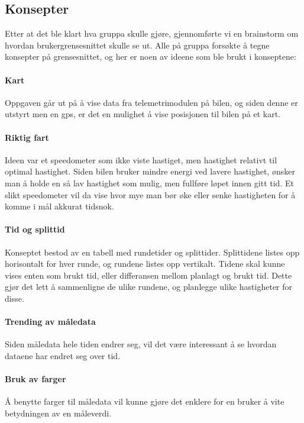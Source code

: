 \subsection{Konsepter}
Etter at det ble klart hva gruppa skulle gjøre, gjennomførte vi en brainstorm om hvordan brukergrensesnittet skulle se ut.
Alle på gruppa forsøkte å tegne konsepter på grensesnittet, og her er noen av ideene som ble brukt i konseptene:
 

\paragraph{Kart}
Oppgaven går ut på å vise data fra telemetrimodulen på bilen, og siden denne er utstyrt men en gps, er det en mulighet å vise posisjonen til bilen på et kart.

\paragraph{Riktig fart}
Ideen var et speedometer som ikke viste hastiget, men hastighet relativt til optimal hastighet. 
Siden bilen bruker mindre energi ved lavere hastighet, ønsker man å holde en så lav hastighet som mulig, men fullføre løpet innen gitt tid.
Et slikt speedometer vil da vise hvor mye man bør øke eller senke hastigheten for å komme i mål akkurat tidsnok.

\paragraph{Tid og splittid}
Konseptet bestod av en tabell med rundetider og splittider.
Splittidene listes opp horisontalt for hver runde, og rundene listes opp vertikalt.
Tidene skal kunne vises enten som brukt tid, eller differansen mellom planlagt og brukt tid.
Dette gjør det lett å sammenligne de ulike rundene, og planlegge ulike hastigheter for disse.

\paragraph{Trending av måledata}
Siden måledata hele tiden endrer seg, vil det være interessant å se hvordan dataene har endret seg over tid.

\paragraph{Bruk av farger}
Å benytte farger til måledata vil kunne gjøre det enklere for en bruker å vite betydningen av en måleverdi.

